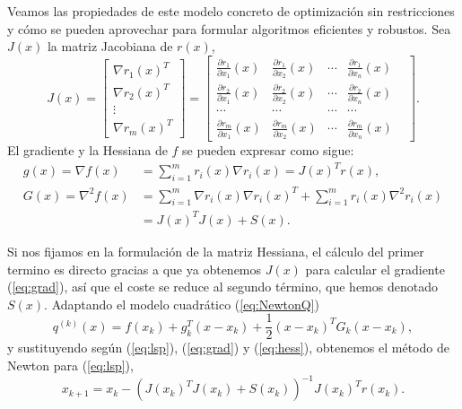 \documentclass[11pt,a4paper]{book}
\theoremstyle{definition}
\theoremstyle{remark}
\begin{document}

Veamos las propiedades de este modelo concreto de optimización sin restricciones y cómo se pueden aprovechar para formular algoritmos eficientes y robustos.
Sea $J(x)$ la matriz Jacobiana de $r(x)$, 
\begin{equation}
	J(x) = 
	\begin{bmatrix}
		\nabla r_1(x)^T \\
		\nabla r_2(x)^T \\
		\vdots \\
		\nabla r_m(x)^T
	\end{bmatrix}
	=
	\begin{bmatrix}
		\frac{\partial r_1}{\partial x_1}(x) &
		\frac{\partial r_1}{\partial x_2}(x) &
		\cdots &
		\frac{\partial r_1}{\partial x_n}(x) \\
		
		\frac{\partial r_2}{\partial x_1}(x) &
		\frac{\partial r_2}{\partial x_2}(x) &
		\cdots &
		\frac{\partial r_2}{\partial x_n}(x) \\
		
		\cdots &
		\cdots &
		\cdots &
		\cdots & \\
		
		\frac{\partial r_m}{\partial x_1}(x) &
		\frac{\partial r_m}{\partial x_2}(x) &
		\cdots &
		\frac{\partial r_m}{\partial x_n}(x) 
	\end{bmatrix}.
\end{equation}
El gradiente y la Hessiana de $f$ se pueden expresar como sigue:
\begin{align}
	g(x) = \nabla f(x) &= \sum_{i=1}^m r_i(x) \nabla r_i(x) = J(x)^Tr(x), \label{eq:grad}\\
	G(x) = \nabla^2 f(x) &= \sum_{i=1}^m \nabla r_i(x) \nabla r_i(x)^T + \sum_{i=1}^m r_i(x)\nabla^2r_i(x) \nonumber \\
	&= J(x)^TJ(x)+S(x). \label{eq:hess}
\end{align}

Si nos fijamos en la formulación de la matriz Hessiana, el cálculo del primer termino es directo gracias a que ya obtenemos $J(x)$ para calcular el gradiente (\ref{eq:grad}), así que el coste se reduce al segundo término, que hemos denotado $S(x)$.
Adaptando el modelo cuadrático (\ref{eq:NewtonQ})
\begin{equation}
	q^{(k)}(x) = f(x_k) + g^T_k(x-x_k) + \frac{1}{2}(x-x_k)^TG_k(x-x_k),
	\label{eq:q}
\end{equation}
y sustituyendo según (\ref{eq:lsp}), (\ref{eq:grad}) y (\ref{eq:hess}), obtenemos el método de Newton para (\ref{eq:lsp}),
\begin{equation}
	x_{k+1} = x_k-(J(x_k)^TJ(x_k)+S(x_k))^{-1}J(x_k)^Tr(x_k).
	\label{eq:newtoniter}
\end{equation}
\end{document}
